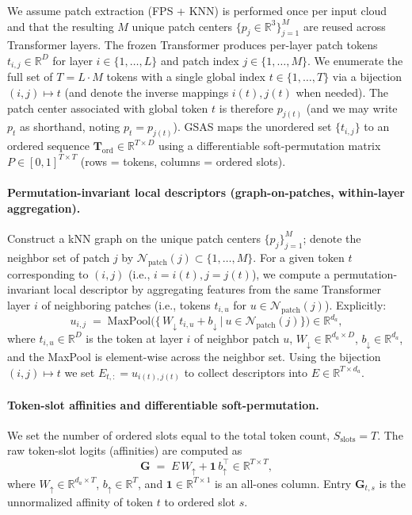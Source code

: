 We assume patch extraction (FPS + KNN) is performed once per input cloud and that the resulting \(M\) unique patch centers \(\{p_j\in\mathbb{R}^3\}_{j=1}^M\) are reused across Transformer layers. The frozen Transformer produces per-layer patch tokens \(t_{i,j}\in\mathbb{R}^D\) for layer \(i\in\{1,\dots,L\}\) and patch index \(j\in\{1,\dots,M\}\). We enumerate the full set of \(T=L\cdot M\) tokens with a single global index \(t\in\{1,\dots,T\}\) via a bijection \((i,j)\mapsto t\) (and denote the inverse mappings \(i(t), j(t)\) when needed). The patch center associated with global token \(t\) is therefore \(p_{j(t)}\) (and we may write \(p_t\) as shorthand, noting \(p_t = p_{j(t)}\)). GSAS maps the unordered set \(\{t_{i,j}\}\) to an ordered sequence \(\mathbf{T}_{\mathrm{ord}}\in\mathbb{R}^{T\times D}\) using a differentiable soft-permutation matrix \(P\in[0,1]^{T\times T}\) (rows = tokens, columns = ordered slots).

\paragraph{Permutation-invariant local descriptors (graph-on-patches, within-layer aggregation).}
Construct a kNN graph on the unique patch centers \(\{p_j\}_{j=1}^M\); denote the neighbor set of patch \(j\) by \(\mathcal{N}_{\mathrm{patch}}(j)\subset\{1,\dots,M\}\). For a given token \(t\) corresponding to \((i,j)\) (i.e., \(i=i(t), j=j(t)\)), we compute a permutation-invariant local descriptor by aggregating features from the same Transformer layer \(i\) of neighboring patches (i.e., tokens \(t_{i,u}\) for \(u\in\mathcal{N}_{\mathrm{patch}}(j)\)). Explicitly:
\begin{equation}
u_{i,j} \;=\; \mathrm{MaxPool}\Big(\big\{\,W_{\downarrow}\,t_{i,u} + b_{\downarrow} \ \big|\ u\in\mathcal{N}_{\mathrm{patch}}(j)\big\}\Big)\in\mathbb{R}^{d_a},
\end{equation}
where \(t_{i,u}\in\mathbb{R}^D\) is the token at layer \(i\) of neighbor patch \(u\), \(W_{\downarrow}\in\mathbb{R}^{d_a\times D}\), \(b_{\downarrow}\in\mathbb{R}^{d_a}\), and the MaxPool is element-wise across the neighbor set. Using the bijection \((i,j)\!\mapsto\! t\) we set \(E_{t,:}=u_{i(t),j(t)}\) to collect descriptors into \(E\in\mathbb{R}^{T\times d_a}\).

\paragraph{Token-slot affinities and differentiable soft-permutation.}
We set the number of ordered slots equal to the total token count, \(S_{\mathrm{slots}}=T\). The raw token-slot logits (affinities) are computed as
\begin{equation}
\mathbf{G} \;=\; E\,W_{\uparrow} + \mathbf{1}\,b_{\uparrow}^\top \in\mathbb{R}^{T\times T},
\end{equation}
where \(W_{\uparrow}\in\mathbb{R}^{d_a\times T}\), \(b_{\uparrow}\in\mathbb{R}^T\), and \(\mathbf{1}\in\mathbb{R}^{T\times 1}\) is an all-ones column. Entry \(\mathbf{G}_{t,s}\) is the unnormalized affinity of token \(t\) to ordered slot \(s\).

